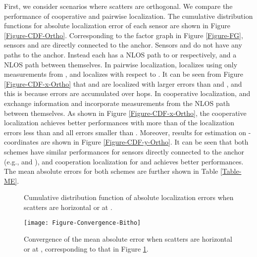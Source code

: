 \documentclass[10pt, twocolumn, final]{IEEEtran}
\begin{document}
First, we consider scenarios where scatters are orthogonal. We compare the performance of cooperative and pairwise localization. The cumulative distribution functions for absolute localization error of each sensor are shown in Figure \ref{Figure-CDF-Ortho}. Corresponding to the factor graph in Figure \ref{Figure-FG}, sensors  and  are directly connected to the anchor. Sensors  and  do not have any paths to the anchor. Instead each has a NLOS path to  or  respectively, and a NLOS path between themselves. In pairwise localization,  localizes using only measurements from , and  localizes with respect to . It can be seen from Figure \ref{Figure-CDF-x-Ortho} that  and  are localized with larger errors than  and , and this is because errors are accumulated over hops. In cooperative localization,  and  exchange information and incorporate measurements from the NLOS path between themselves. As shown in Figure \ref{Figure-CDF-x-Ortho}, the cooperative localization achieves better performances with more than  of the localization errors less than  and all errors smaller than . Moreover, results for estimation on -coordinates are shown in Figure \ref{Figure-CDF-y-Ortho}. It can be seen that both schemes have similar performances for sensors directly connected to the anchor (e.g.,  and ), and cooperation localization for  and  achieves better performances. The mean absolute errors for both schemes are further shown in Table \ref{Table-ME}.

\begin{figure}
  \centering
  \caption{Cumulative distribution function of absolute localization errors when scatters are horizontal or at .} \label{Figure-CDF-Bitho}
\end{figure}

\begin{figure}[!t]
\centering
\texttt{[image: Figure-Convergence-Bitho]}
\caption{Convergence of the mean absolute error when scatters are horizontal or at , corresponding to that in Figure \ref{Figure-CDF-Bitho}.} \label{Figure-Convergence}
\end{figure}
\end{document}
